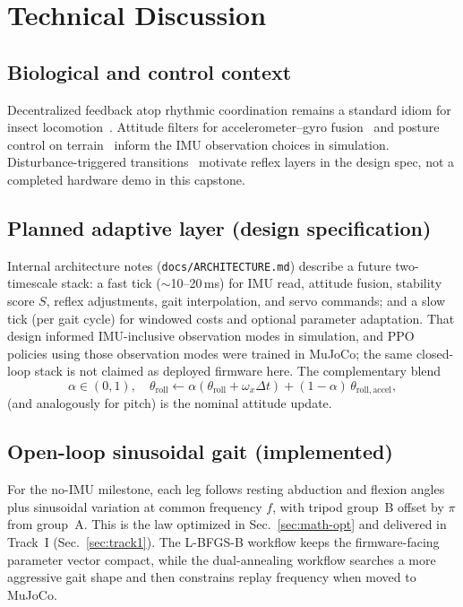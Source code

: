\documentclass[11pt]{article}
\begin{document}
\section{Technical Discussion}

\subsection{Biological and control context}
Decentralized feedback atop rhythmic coordination remains a standard idiom for insect locomotion~\cite{aydin2023mechanosensory,chen2021adaptive}. Attitude filters for accelerometer--gyro fusion~\cite{valenti2015quaternion,zhang2021attitude} and posture control on terrain~\cite{bai2019posture} inform the IMU observation choices in simulation. Disturbance-triggered transitions~\cite{johnson2010disturbance} motivate reflex layers in the design spec, not a completed hardware demo in this capstone.

\subsection{Planned adaptive layer (design specification)}
Internal architecture notes (\texttt{docs/ARCHITECTURE.md}) describe a future two-timescale stack: a fast tick ($\sim$10--20\,ms) for IMU read, attitude fusion, stability score $S$, reflex adjustments, gait interpolation, and servo commands; and a slow tick (per gait cycle) for windowed costs and optional parameter adaptation. That design informed IMU-inclusive observation modes in simulation, and PPO policies using those observation modes were trained in MuJoCo; the same closed-loop stack is not claimed as deployed firmware here. The complementary blend
\begin{equation}
\alpha \in (0,1),\quad
\theta_{\mathrm{roll}} \leftarrow \alpha(\theta_{\mathrm{roll}} + \omega_x \Delta t) + (1-\alpha)\,\theta_{\mathrm{roll,accel}},
\end{equation}
(and analogously for pitch) is the nominal attitude update.

\subsection{Open-loop sinusoidal gait (implemented)}
For the no-IMU milestone, each leg follows resting abduction and flexion angles plus sinusoidal variation at common frequency $f$, with tripod group~B offset by $\pi$ from group~A. This is the law optimized in Sec.~\ref{sec:math-opt} and delivered in Track~I (Sec.~\ref{sec:track1}). The L-BFGS-B workflow keeps the firmware-facing parameter vector compact, while the dual-annealing workflow searches a more aggressive gait shape and then constrains replay frequency when moved to MuJoCo.
\end{document}
